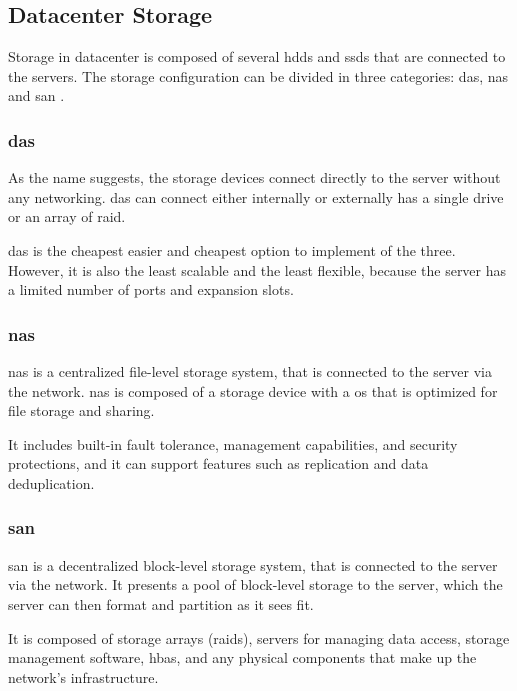 \subsection{Datacenter Storage}

Storage in datacenter is composed of several \acp{hdd} and \acp{ssd} that are connected to the servers. The storage configuration can be divided in three categories: \ac{das}, \ac{nas} and \ac{san} \citet{Storage101}.

\subsubsection{\acl{das}}

As the name suggests, the storage devices connect directly to the server without any networking. \ac{das} can connect either internally or externally has a single drive or an array of \ac{raid}. 

\ac{das} is the cheapest easier and cheapest option to implement of the three. However, it is also the least scalable and the least flexible, because the server has a limited number of ports and expansion slots.

\subsubsection{\acl{nas}}

\ac{nas} is a centralized file-level storage system, that is connected to the server via the network. \ac{nas} is composed of a storage device with a \ac{os} that is optimized for file storage and sharing.

It includes built-in fault tolerance, management capabilities, and security protections, and it can support features such as replication and data deduplication.

\subsubsection{\acl{san}}

\ac{san} is a decentralized block-level storage system, that is connected to the server via the network. It presents a pool of block-level storage to the server, which the server can then format and partition as it sees fit.

It is composed of storage arrays (\acp{raid}), servers for managing data access, storage management software, \acp{hba}, and any physical components that make up the network's infrastructure.

